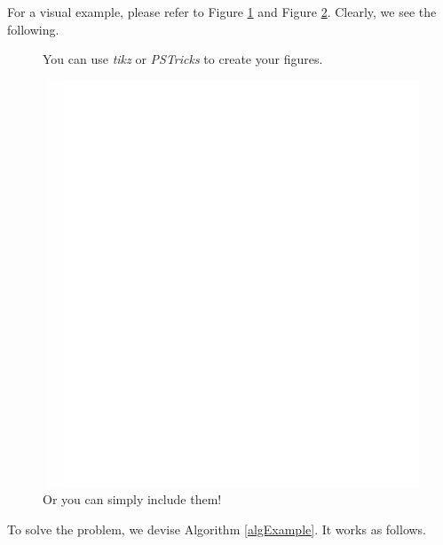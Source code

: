 \documentclass[12pt]{article}
\begin{document}
For a visual example, please refer to Figure \ref{figExample1} and Figure \ref{figExample2}. Clearly, we see the following. \lipsum[1]

\begin{figure}[htbp]
\centering
\caption{You can use {\em tikz} or {\em PSTricks} to create your figures. \label{figExample1}}
\end{figure}

\begin{figure}[htbp]
\centering
\caption{Or you can simply include them! \label{figExample2}}
 \includegraphics[scale=0.8]{example.pdf}
\end{figure}



To solve the problem, we devise Algorithm \ref{algExample}. It works as follows. \lipsum[2-4]
\end{document}
